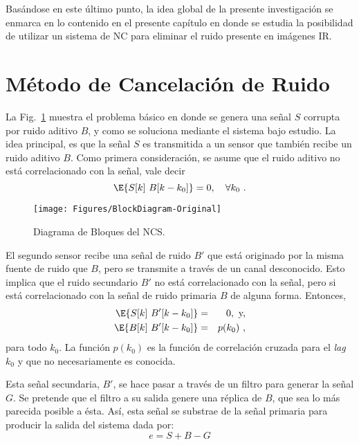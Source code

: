 Basándose en este último punto, la idea global de la presente investigación se enmarca en lo contenido en el presente capítulo en donde se estudia la posibilidad de utilizar un sistema de \ac{NC} para eliminar el ruido presente en imágenes \ac{IR}.

\section{Método de Cancelación de Ruido}
La Fig.~\ref{Fig:NC-Original} muestra el problema básico en donde se genera una señal $S$ corrupta por ruido aditivo $B$, y como se soluciona mediante el sistema bajo estudio. La idea principal, es que la señal $S$ es transmitida a un sensor que también recibe un ruido aditivo $B$. Como primera consideración, se asume que el ruido aditivo no está correlacionado con la señal, vale decir
\begin{equation}
 \E{S[k]~B[k-k_0]} = 0,~~~\forall k_0~.
 \label{Eq:xcorSB}
\end{equation}

\begin{figure}[tb]
 \centering
 \texttt{[image: Figures/BlockDiagram-Original]}
 \caption{Diagrama de Bloques del NCS.}
 \label{Fig:NC-Original}
\end{figure}

El segundo sensor recibe una señal de ruido $B'$ que está originado por la misma fuente de ruido que $B$, pero se transmite a través de un canal desconocido. Esto implica que el ruido secundario $B'$ no está correlacionado con la señal, pero si está correlacionado con la señal de ruido primaria $B$ de alguna forma. Entonces,
\begin{eqnarray}
 \E{S[k]~B'[k-k_0]} &=& 0,\mbox{ y,} \label{Eq:xcorSBp} \\
 \E{B[k]~B'[k-k_0]} &=& p(k_0)~, \label{Eq:xcorBBp}
\end{eqnarray}
para todo $k_0$. La función $p(k_0)$ es la función de correlación cruzada para el \textit{lag} $k_0$ y que no necesariamente es conocida.

Esta señal secundaria, $B'$, se hace pasar a través de un filtro para generar la señal $G$. Se pretende que el filtro a su salida genere una réplica de $B$, que sea lo más parecida posible a ésta. Así, esta señal se substrae de la señal primaria para producir la salida del sistema dada por:
\begin{equation}
 e = S + B - G
 \label{Eq:NC-Error}
\end{equation}

